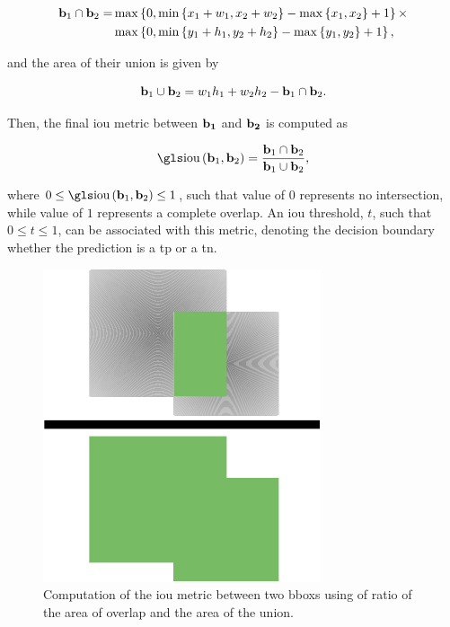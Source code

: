 \begin{equation}
\begin{aligned}
    \mathbf{b}_1 \cap \mathbf{b}_2 =
    &\max \left\{ {0,
                    \min \left\{ {x_1 + w_1, x_2 + w_2} \right\} - \max \left\{ {x_1, x_2} \right\} + 1} \right\}
    \times\\
    &\max \left\{ {0,
                    \min \left\{ {y_1 + h_1, y_2 + h_2} \right\} - \max \left\{ {y_1, y_2} \right\} + 1} \right\},
\end{aligned}
\end{equation}

\noindent and the area of their union is given by

\begin{equation}
    \mathbf{b}_1 \cup \mathbf{b}_2 = w_1 h_1 + w_2 h_2 - \mathbf{b}_1 \cap \mathbf{b}_2.
\end{equation}

\noindent Then, the final \gls{iou} metric between $\mathbf{b_1}$ and $\mathbf{b_2}$ is computed as

\begin{equation}
    \label{eq:IntersectionOverUnion}
    \func{\IOU}{\vect{b}_1, \vect{b}_2} =
    \frac{\vect{b}_1 \cap \vect{b}_2}{\vect{b}_1 \cup \vect{b}_2},
\end{equation}

\noindent where $0 \leq \func{\IOU}{\vect{b}_1, \vect{b}_2} \leq 1$, such that value of $0$ represents no intersection, while value of $1$ represents a complete overlap. An \gls{iou} threshold, $t$, such that $0 \leq t \leq 1$, can be associated with this metric, denoting the decision boundary whether the prediction is a \gls{tp} or a \gls{tn}.

\begin{figure}[t]
    \centerline{\includegraphics[width=0.25\linewidth]{figures/theoretical_foundations/intersection_over_union.pdf}}
    \caption[\Gls{iou} visualization]{Computation of the \gls{iou} metric between two \glspl{bbox} using of ratio of the area of overlap and the area of the union.}
    \label{fig:IntersectionOverUnion}
\end{figure}

